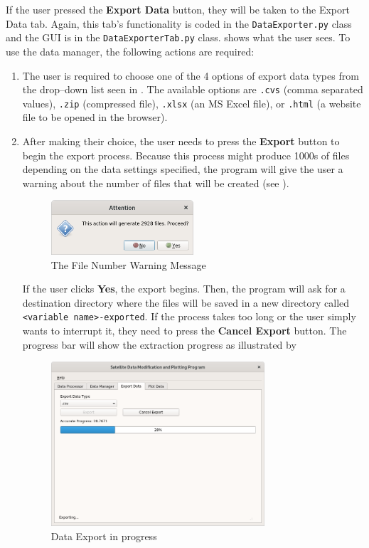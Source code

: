 \documentclass[../00_main.tex]{subfiles}
\begin{document}
If the user pressed the \textbf{Export Data} button, they will be taken to the
Export Data tab. Again, this tab's functionality is coded in the
\texttt{DataExporter.py} class and the GUI is in the
\texttt{DataExporterTab.py} class.  shows what the user sees. To
use the data manager, the following actions are required:
\begin{enumerate}
    \item The user is required to choose one of the 4 options of export data
        types from the drop--down list seen in . The available
        options are \texttt{.cvs} (comma separated values), \texttt{.zip}
        (compressed file), \texttt{.xlsx} (an MS Excel file), or \texttt{.html}
        (a website file to be opened in the browser). 
    \item After making their choice, the user needs to press the
        \textbf{Export} button to begin the export process. Because this
        process might produce 1000s of files depending on the data settings
        specified, the program will give the user a warning about the number of
        files that will be created (see ). 
        \begin{figure}[H]
            \center
            \includegraphics[width=0.5\textwidth]{../graphics/de02}
            \caption{The File Number Warning Message}
            \label{de02}
        \end{figure}
        If the user clicks \textbf{Yes}, the
        export begins. Then, the program will ask for a destination directory 
        where the files
        will be saved in a new directory called \texttt{<variable
        name>-exported}. If the process
        takes too long or the user simply wants to interrupt it, they need to
        press the \textbf{Cancel Export} button. The progress bar will show the
        extraction progress as illustrated by 
        \begin{figure}[H]
            \center
            \includegraphics[width=0.75\textwidth]{../graphics/de03}
            \caption{Data Export in progress}
            \label{de03}
        \end{figure}
\end{enumerate}
\end{document}
